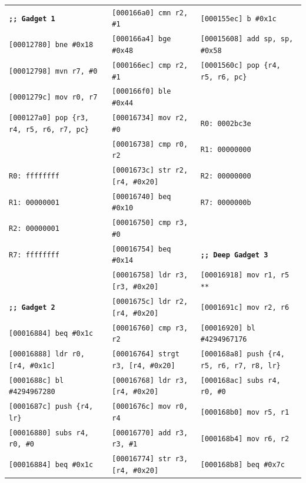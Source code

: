 \documentclass[9pt]{beamer}
\begin{document}
\begin{frame}{}
\begin{center}
{\begin{tabular}{l l l}
        \textbf{\texttt{;; Gadget 1}} 		& \texttt{[000166a0]  cmn r2, \#1}		& \texttt{[000155ec]  b \#0x1c} \\
        \texttt{[00012780]  bne \#0x18}	& \texttt{[000166a4]  bge \#0x48}			& \texttt{[00015608]  add sp, sp, \#0x58} \\
        \texttt{[00012798]  mvn r7, \#0}	& \texttt{[000166ec]  cmp r2, \#1}			& \texttt{[0001560c]  pop \{r4, r5, r6, pc\}} \\
        \texttt{[0001279c]  mov r0, r7}	& \texttt{[000166f0]  ble \#0x44}			& \\
        \texttt{[000127a0]  pop \{r3, r4, r5, r6, r7, pc\}} & \texttt{[00016734]  mov r2, \#0} & \texttt{R0: 0002bc3e} \\
 				& \texttt{[00016738]  cmp r0, r2}			& \texttt{R1: 00000000} \\
        \texttt{R0: ffffffff}			& \texttt{[0001673c]  str r2, [r4, \#0x20]}		& \texttt{R2: 00000000} \\
        \texttt{R1: 00000001}		& \texttt{[00016740]  beq \#0x10}			& \texttt{R7: 0000000b} \\
        \texttt{R2: 00000001}		& \texttt{[00016750]  cmp r3, \#0}			& \\
        \texttt{R7: ffffffff}			& \texttt{[00016754]  beq \#0x14}			& \textbf{\texttt{;; Deep Gadget 3}} \\
 					& \texttt{[00016758]  ldr r3, [r3, \#0x20]}	& \texttt{[00016918]  mov r1, r5   **}\\
        \textbf{\texttt{;; Gadget 2}}		& \texttt{[0001675c]  ldr r2, [r4, \#0x20]}		& \texttt{[0001691c]  mov r2, r6} \\
        \texttt{[00016884]  beq \#0x1c}	& \texttt{[00016760]  cmp r3, r2}			& \texttt{[00016920]  bl \#4294967176} \\
        \texttt{[00016888]  ldr r0, [r4, \#0x1c]} & \texttt{[00016764]  strgt r3, [r4, \#0x20]} & \texttt{[000168a8]  push \{r4, r5, r6, r7, r8, lr\}} \\
        \texttt{[0001688c]  bl \#4294967280} & \texttt{[00016768]  ldr r3, [r4, \#0x20]}	& \texttt{[000168ac]  subs r4, r0, \#0} \\
        \texttt{[0001687c]  push \{r4, lr\}}	& \texttt{[0001676c]  mov r0, r4}		& \texttt{[000168b0]  mov r5, r1} \\
        \texttt{[00016880]  subs r4, r0, \#0} & \texttt{[00016770]  add r3, r3, \#1}		& \texttt{[000168b4]  mov r6, r2} \\
        \texttt{[00016884]  beq \#0x1c}	& \texttt{[00016774]  str r3, [r4, \#0x20]}		& \texttt{[000168b8]  beq \#0x7c} \\

\end{tabular}}
\end{center}
\end{frame}
\end{document}
